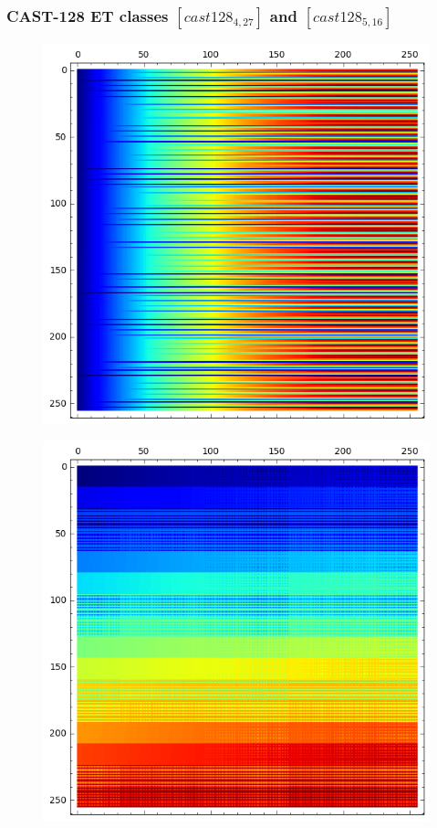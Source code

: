 \documentclass[pdf,sprung,slideColor,nocolorBG]{beamer}
\newenvironment{colortheme}[1]{
\def\ProvidesPackageRCS $##1${\relax}
\renewcommand{\ProcessOptions}{\relax}
\makeatletter

\makeatother
}{}
\begin{document}
\begin{colortheme}{jubata}
\begin{frame}
\frametitle{CAST-128 ET classes $[cast128_{4,27}]$ and $[cast128_{5,16}]$}
\begin{figure}
\centering
\begin{minipage}{.48\textwidth}
  \centering
\includegraphics[width=.9\linewidth]{../matrix_plot/cast128_4_27_bent_cayley_graph_index_matrix.png}
  \label{fig:cast128_4_27_bent_cayley_graph_index_matrix}
\end{minipage}%
\begin{minipage}{.48\textwidth}
  \centering
\includegraphics[width=.9\linewidth]{../matrix_plot/cast128_5_16_bent_cayley_graph_index_matrix.png}

\end{minipage}
\end{figure}
\end{frame}
\end{colortheme}
\end{document}
